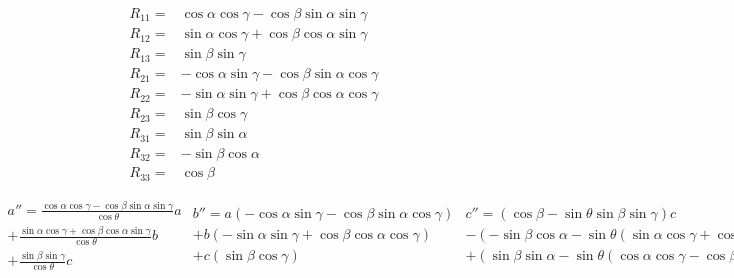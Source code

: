 \begin{subequations}\label{euler_rotation_matrix}
\begin{align}
	R_{11}=&\cos \alpha \cos \gamma -\cos \beta \sin \alpha \sin \gamma\\
	R_{12}=&\sin \alpha \cos \gamma +\cos \beta \cos \alpha \sin \gamma\\
	R_{13}=&\sin \beta \sin \gamma\\
	R_{21}=&-\cos \alpha \sin \gamma -\cos \beta \sin \alpha \cos \gamma\\
	R_{22}=&-\sin \alpha \sin \gamma +\cos \beta \cos \alpha \cos \gamma\\
	R_{23}=&\sin \beta \cos \gamma\\
	R_{31}=&\sin \beta \sin \alpha\\
	R_{32}=&-\sin \beta \cos \alpha\\
	R_{33}=&\cos \beta
\end{align}
\end{subequations}

\begin{subequations}
\begin{multline}\label{formula_a_prime_prime}
a''=\frac{\cos \alpha \cos \gamma -\cos \beta \sin \alpha \sin \gamma}{\cos \theta}a\\
+\frac{\sin \alpha \cos \gamma +\cos \beta \cos \alpha \sin \gamma}{\cos \theta}b\\
+\frac{\sin \beta \sin \gamma}{\cos \theta}c
\end{multline}
\begin{multline}\label{formula_b_prime_prime}
b''=a\left( -\cos \alpha \sin \gamma -\cos \beta \sin \alpha \cos \gamma \right)\\
+b\left( -\sin \alpha \sin \gamma +\cos \beta \cos \alpha \cos \gamma \right)\\
+c\left( \sin \beta \cos \gamma \right)
\end{multline}
\begin{multline}\label{formula_c_prime_prime}
c''=\left( \cos \beta -\sin \theta \sin \beta \sin \gamma \right) c\\
-\left(-\sin \beta \cos \alpha -\sin \theta \left( \sin \alpha \cos \gamma +\cos \beta \cos \alpha \sin \gamma \right) \right) b\\
+\left( \sin \beta \sin \alpha -\sin \theta \left( \cos \alpha \cos \gamma -\cos \beta \sin \alpha \sin \gamma \right) \right) a
\end{multline}
\end{subequations}


